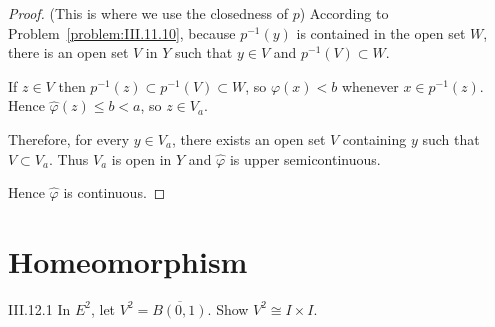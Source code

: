\begin{proof}
	(This is where we use the closedness of \( p \)) According to Problem~\ref{problem:III.11.10}, because \( p^{-1}(y) \) is contained in the open set \( W \), there is an open set \( V \) in \( Y \) such that \( y \in V \) and \( p^{-1}(V) \subset W \).

	If \( z \in V \) then \( p^{-1}(z) \subset p^{-1}(V) \subset W \), so \( \varphi(x) < b \) whenever \( x \in p^{-1}(z) \). Hence \( \hat{\varphi}(z) \le b < a \), so \( z \in V_{a} \).

	Therefore, for every \( y \in V_{a} \), there exists an open set \( V \) containing \( y \) such that \( V \subset V_{a} \). Thus \( V_{a} \) is open in \( Y \) and \( \hat{\varphi} \) is upper semicontinuous.

	\bigskip
	Hence \( \hat{\varphi} \) is continuous.
\end{proof}

\section{Homeomorphism}

\begin{problem}{III.12.1}
In \( E^{2} \), let \( V^{2} = \overline{B(0, 1)} \). Show \( V^{2} \cong I \times I \).
\end{problem}

